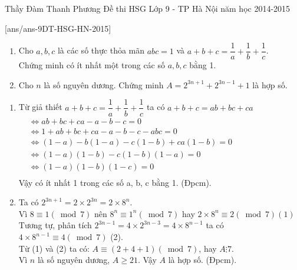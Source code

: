 \begin{name}
{Thầy  Đàm Thanh Phương}
{Đề thi HSG Lớp 9 - TP Hà Nội năm học 2014-2015}
\end{name}
\setcounter{ex}{0}
[ans/ans-9DT-HSG-HN-2015]
\begin{ex}%
    \hfill
    \begin{enumerate}
        \item Cho $a,b,c$ là các số thực thỏa mãn $abc=1$ và $a+b+c =\dfrac{1}{a}+\dfrac{1}{b}+\dfrac{1}{c}$.\\
         Chứng minh có ít nhất một trong các số $a, b, c$ bằng 1.
        \item Cho $n$ là số nguyên dương. Chứng minh $A=2^{3n+1}+2^{3n-1}+1$ là hợp số.
    \end{enumerate}
\loigiai
    {
    \begin{enumerate}
        \item Từ giả thiết $a+b+c =\dfrac{1}{a}+\dfrac{1}{b}+\dfrac{1}{c}$ ta có $a+b+c=ab+bc+ca$\\
         $
        \begin{aligned}
        &\Leftrightarrow ab+bc+ca-a-b-c=0\\
        &\Leftrightarrow 1+ab+bc+ca-a-b-c-abc=0\\
        &\Leftrightarrow (1-a)-b(1-a)-c(1-b)+ca(1-b)=0\\
        &\Leftrightarrow (1-a)(1-b)-c(1-b)(1-a)=0\\
        &\Leftrightarrow (1-a)(1-b)(1-c)=0\\
       \end{aligned}
       $\\
        Vậy có ít nhất 1 trong các số a, b, c bằng 1. (Đpcm).
        \item Ta có $2^{3n+1}=2\times 2^{3n}=2\times 8^n$.\\ Vì $8\equiv 1(\bmod 7)$ nên $8^n \equiv 1^n(\bmod 7)$ hay $2\times 8^n \equiv 2 (\bmod 7) (1)$\\
        Tương tự, phân tích $2^{3n-1}=4\times 2^{3n-3}=4\times 8^{n-1}$ ta có $4\times 8^{n-1} \equiv 4 (\bmod 7)$ (2).\\
        Từ (1) và (2) ta có: $A \equiv (2+4+1) (\bmod 7)$, hay $A \vdots 7$. \\Vì $n$ là số nguyên dương, $A \ge 21$. Vậy $A$ là hợp số. (Đpcm).
        
    \end{enumerate}
    }
\end{ex}


